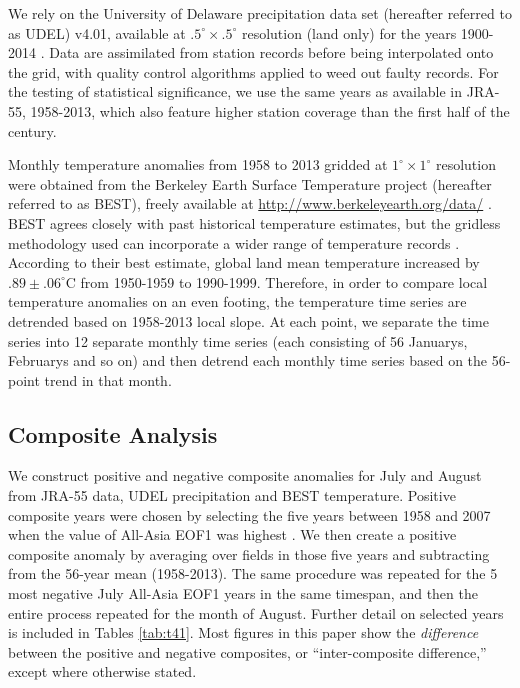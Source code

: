 	We rely on the University of Delaware precipitation data set (hereafter referred to as UDEL) v4.01, available at $.5^{\circ} \times .5^{\circ}$ resolution (land only) for the years 1900-2014 \citep{Matsuura2015}. Data are assimilated from station records before being interpolated onto the grid, with quality control algorithms applied to weed out faulty records. For the testing of statistical significance, we use the same years as available in JRA-55, 1958-2013, which also feature higher station coverage than the first half of the  century.

	Monthly temperature anomalies from 1958 to 2013 gridded at $1^{\circ} \times 1^{\circ}$ resolution were obtained from the Berkeley Earth Surface Temperature project (hereafter referred to as BEST), freely available at \url{http://www.berkeleyearth.org/data/} \citep{Rohde2012}. BEST agrees closely with past historical temperature estimates, but the gridless methodology used can incorporate a wider range of temperature records \citep{Rohde2013}. According to their best estimate, global land mean temperature increased by $.89 \pm .06^{\circ}$C from 1950-1959 to 1990-1999. Therefore, in order to compare local temperature anomalies on an even footing, the temperature time series are detrended based on 1958-2013 local slope. At each point, we separate the time series into 12 separate monthly time series (each consisting of 56 Januarys, Februarys and so on) and then detrend each monthly time series based on the 56-point trend in that month.
	
\subsection{Composite Analysis}		
	
	We construct positive and negative composite anomalies for July and August from JRA-55 data, UDEL precipitation and BEST temperature. Positive composite years were chosen by selecting the five years between 1958 and 2007 when the value of All-Asia EOF1 was highest \citep{Day2015}. We then create a positive composite anomaly by averaging over fields in those five years and subtracting from the 56-year mean (1958-2013). The same procedure was repeated for the 5 most negative July All-Asia EOF1 years in the same timespan, and then the entire process repeated for the month of August. Further detail on selected years is included in Tables \ref{tab:t41}. Most figures in this paper show the \textit{difference} between the positive and negative composites, or ``inter-composite difference,'' except where otherwise stated.
	
